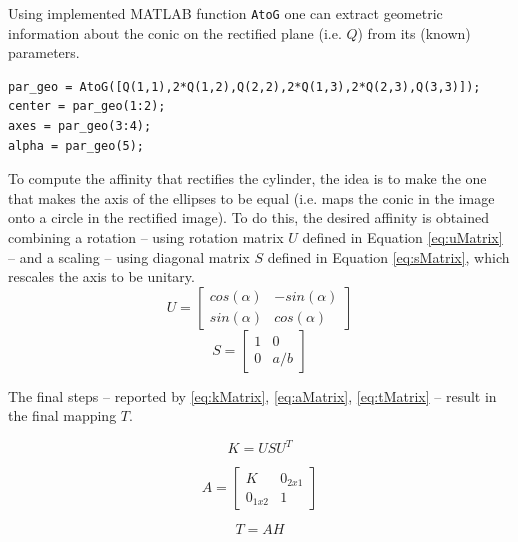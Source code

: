 \documentclass[12pt,a4paper]{article}
\begin{document}
Using implemented MATLAB function \verb|AtoG| one can extract geometric information about the conic on the rectified plane (i.e. $Q$) from its (known) parameters.

\begin{verbatim}
par_geo = AtoG([Q(1,1),2*Q(1,2),Q(2,2),2*Q(1,3),2*Q(2,3),Q(3,3)]);
center = par_geo(1:2);
axes = par_geo(3:4);
alpha = par_geo(5);
\end{verbatim}

To compute the affinity that rectifies the cylinder, the idea is to make the one that makes the axis of the ellipses to be equal (i.e. maps the conic in the image onto a circle in the rectified image). To do this, the desired affinity is obtained combining a rotation -- using rotation matrix $U$ defined in Equation \ref{eq:uMatrix} -- and a scaling -- using diagonal matrix $S$ defined in Equation \ref{eq:sMatrix}, which rescales the axis to be unitary.\\

\begin{equation}
    U = 
    \begin{bmatrix}
    cos(\alpha) & -sin(\alpha)\\
    sin(\alpha) & cos(\alpha)
    \end{bmatrix}
    \label{eq:uMatrix}
\end{equation}
\bigskip
\begin{equation}
    S = 
    \begin{bmatrix}
    1 & 0\\
    0 & a/b
    \end{bmatrix}
    \label{eq:sMatrix}
\end{equation}
\bigskip

The final steps -- reported by \ref{eq:kMatrix}, \ref{eq:aMatrix}, \ref{eq:tMatrix} -- result in the final mapping $T$.

\begin{equation}
    K = USU^T
    \label{eq:kMatrix}
\end{equation}

\begin{equation}
    A = 
    \begin{bmatrix}
    K & 0_{2x1}\\
    0_{1x2} & 1
    \end{bmatrix}
    \label{eq:aMatrix}
\end{equation}

\begin{equation}
    T = AH
    \label{eq:tMatrix}
\end{equation}
\end{document}
